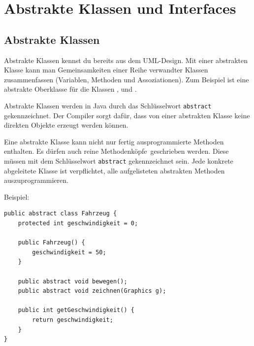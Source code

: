 \chapter{Abstrakte Klassen und Interfaces}
\renewcommand{\chaptertitle}{Abstrakte Klassen und Interfaces}

\lehead[]{\normalfont\sffamily\hspace*{-2.00cm}\textcolor{white}{\colorbox{lightblue}{\makebox[1.60cm][r]{\thechapter}}}\hspace{0.17cm}\textcolor{lightblue}{\chaptertitle}}
\rohead[]{\textcolor{lightblue}{\chaptertitle}\normalfont\sffamily\hspace*{0.17cm}\textcolor{white}{\colorbox{lightblue}{\makebox[1.60cm][l]{\thechapter}}}\hspace{-2.00cm}}
\rehead[]{\textcolor{lightblue}{AvHG, Inf, My}}
\lohead[]{\textcolor{lightblue}{AvHG, Inf, My}}

\lstset{style=myJava}

\section{Abstrakte Klassen}

Abstrakte Klassen kennst du bereits aus dem UML-Design. Mit einer abstrakten
Klasse kann man Gemeinsamkeiten einer Reihe verwandter Klassen zusammenfassen
(Variablen, Methoden und Assoziationen). Zum Beispiel ist 
eine abstrakte Oberklasse für die Klassen , 
und .

Abstrakte Klassen werden in Java durch das Schlüsselwort \lstinline|abstract|
gekennzeichnet. Der Compiler sorgt dafür, dass von einer abstrakten Klasse
keine direkten Objekte erzeugt werden können.

Eine abstrakte Klasse kann nicht nur fertig ausprogrammierte Methoden
enthalten. Es dürfen auch reine \glqq Methodenköpfe\grqq\ geschrieben werden.
Diese müssen mit dem Schlüsselwort \lstinline|abstract| gekennzeichnet sein.
Jede konkrete abgeleitete Klasse ist verpflichtet, alle aufgelisteten
abstrakten Methoden auszuprogrammieren.

Beispiel:

\begin{lstlisting}
public abstract class Fahrzeug {
    protected int geschwindigkeit = 0;

    public Fahrzeug() {
        geschwindigkeit = 50;
    }

    public abstract void bewegen();
    public abstract void zeichnen(Graphics g);
    
    public int getGeschwindigkeit() {
        return geschwindigkeit;
    }
}
\end{lstlisting}



